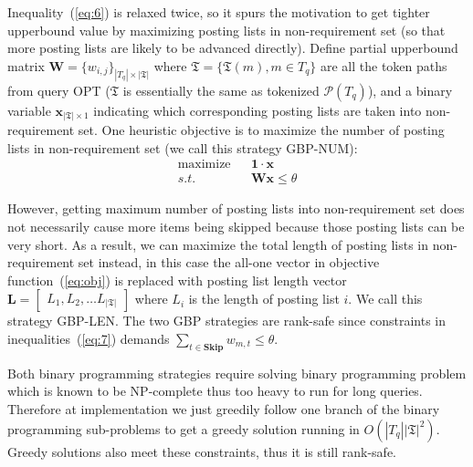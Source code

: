 \documentclass[runningheads]{llncs}
\begin{document}
%
Inequality~(\ref{eq:6}) is relaxed twice, so it spurs the motivation to get tighter upperbound value by maximizing posting lists in non-requirement set (so that more posting lists are likely to be advanced directly).
Define partial upperbound matrix $\mathbf{W} = \{ w_{i, j} \}_{|T_q| \times |\mathfrak{T}|} $ where $\mathfrak{T} = \{ \mathfrak{T}(m), m \in T_q \}$ are all the token paths from query OPT ($\mathfrak{T}$ is essentially the same as tokenized $\mathcal{P}(T_q)$), and a binary variable $\boldsymbol{x}_{|\mathfrak{T}| \times 1}$ indicating which corresponding posting lists are taken into non-requirement set.
One heuristic objective is to maximize the number of posting lists in non-requirement set (we call this strategy GBP-NUM):
\begin{align}
\label{eq:obj}
\text{maximize} && \mathbf{1} \cdot \boldsymbol{x} \\
\label{eq:7}
s.t.            && \mathbf{W} \boldsymbol{x} \le \theta
\end{align}

However, getting maximum number of posting lists into non-requirement set does not necessarily cause more items being skipped because those posting lists can be very short.
As a result, we can maximize the total length of posting lists in non-requirement set instead, in this case the all-one vector in objective function~(\ref{eq:obj}) is replaced with posting list length vector
$\mathbf{L} = \begin{bmatrix} L_1, L_2, \ldots L_{|\mathfrak{T}|}\end{bmatrix}$ where $L_i$ is the length of posting list $i$.
We call this strategy GBP-LEN.
%
The two GBP strategies are rank-safe %
since constraints in inequalities~(\ref{eq:7}) demands $\sum_{t \in \textbf{Skip}} w_{m,t} \le \theta$.

Both binary programming strategies require solving binary programming problem which is known to be NP-complete thus too heavy to run for long queries.
Therefore at implementation we just greedily follow one branch of the binary programming sub-problems to get a greedy solution running in $O(|T_q| |\mathfrak{T}|^2)$.
Greedy solutions also meet these constraints, thus it is still rank-safe.
\end{document}
